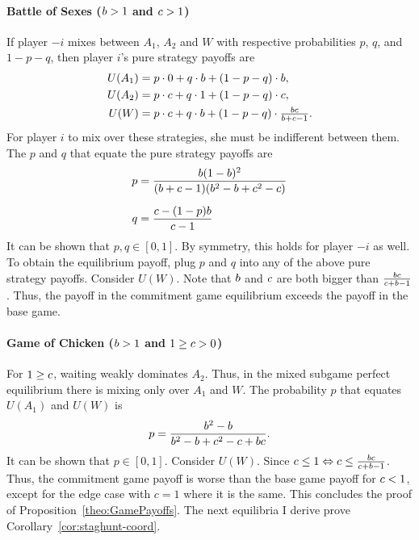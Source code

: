 \documentclass[main.tex]{subfiles}
\begin{document}
\paragraph{Battle of Sexes ($b>1$ and $c>1$)}
If player $-i$ mixes between $A_1$, $A_2$ and $W$ with respective probabilities $p$, $q$, and $1-p-q$, then player $i$'s pure strategy payoffs are
\begin{align*}
U(A_1) &= p\cdot 0 + q\cdot b + (1-p-q)\cdot b,\\[0mm]
U(A_2) &= p\cdot c + q\cdot 1 + (1-p-q)\cdot c,\\[0mm]
U(W) &= p\cdot c + q\cdot b + (1-p-q)\cdot \tfrac{bc}{b+c-1}.
\end{align*}
For player $i$ to mix over these strategies, she must be indifferent between them. The $p$ and $q$ that equate the pure strategy payoffs are
\begin{alignat*}{1}
    p &= \frac{b(1-b)^2}{(b+c-1)(b^2-b+c^2-c)}\\[6pt]
    q &= \frac{c-(1-p)b}{c-1}
\end{alignat*}
It can be shown that $p,q\in[0,1]$. By symmetry, this holds for player $-i$ as well. To obtain the equilibrium payoff, plug $p$ and $q$ into any of the above pure strategy payoffs. Consider $U(W)$. Note that $b$ and $c$ are both bigger than $\tfrac{bc}{c+b-1}$. Thus, the payoff in the commitment game equilibrium exceeds the payoff in the base game.
\paragraph{Game of Chicken ($b>1$ and $1\geq c>0$)}
For $1\geq c$, waiting weakly dominates $A_2$. Thus, in the mixed subgame perfect equilibrium there is mixing only over $A_1$ and $W$. The probability $p$ that equates $U(A_1)$ and $U(W)$ is 
\[
p=\frac{b^2-b}{b^2-b+c^2-c+bc}.
\]
It can be shown that $p\in[0,1]$. Consider $U(W)$. Since $c\leq1\Leftrightarrow c\leq\tfrac{bc}{c+b-1}$. Thus, the commitment game payoff is worse than the base game payoff for $c<1$, except for the edge case with $c=1$ where it is the same.
\vspace{0.5cm}
\newline
This concludes the proof of Proposition~\ref{theo:GamePayoffs}. The next equilibria I derive prove Corollary~\ref{cor:staghunt-coord}.
\end{document}
